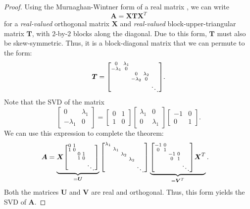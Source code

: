 \documentclass{sig-alternate}
\renewcommand{\cite}{\citep}
\newenvironment{sbmatrix}{\left[\!\begin{smallmatrix}}
{\end{smallmatrix}\!\right]}
\newcommand{\mat}{\boldsymbol}
\providecommand{\mA}{\ensuremath{\mat{A}}}
\providecommand{\mT}{\ensuremath{\mat{T}}}
\providecommand{\mU}{\ensuremath{\mat{U}}}
\providecommand{\mV}{\ensuremath{\mat{V}}}
\providecommand{\mX}{\ensuremath{\mat{X}}}
\begin{document}
\begin{proof}
Using the Murnaghan-Wintner form of a real matrix 
\cite{murnaghan1931-canonical-form}, we can
write 
\[ \mA = \mX \mT \mX^T \]
for a \emph{real-valued} orthogonal matrix $\mX$ and
\emph{real-valued} block-upper-triangular
matrix $\mT$, with $2$-by-$2$ blocks along the diagonal.
Due to this form, $\mT$ must also be skew-symmetric.  Thus,
it is a block-diagonal matrix that 
we can permute to the form: 
\[ \mT = \begin{sbmatrix}
           0 & \lambda_1 \\
           -\lambda_1 & 0 \\
           & & 0 & \lambda_2 \\
           & & -\lambda_2 & 0 \\
           & & & & \ddots \\
\end{sbmatrix}. \]
Note that the SVD of the matrix 
\[ \begin{bmatrix} 0 & \lambda_1 \\ -\lambda_1 & 0 \end{bmatrix} = 
\begin{bmatrix} 0 & 1 \\ 1 & 0 \end{bmatrix}
\begin{bmatrix} \lambda_1 & 0 \\ 0 & \lambda_1 \end{bmatrix}
\begin{bmatrix} -1 & 0 \\ 0 & 1 \end{bmatrix}.
\]
We can use this expression to complete the theorem:
\[
\begin{aligned}
\mA & = 
\underbrace{
	\mX 
	\begin{sbmatrix}
	   0 & 1 \\
	   1 & 0 \\
	   & & 0 & 1 \\
	   & & 1 & 0 \\
	   & & & & \ddots \\
\end{sbmatrix}
}_{= \mU} 
\begin{sbmatrix} 
  	\lambda_1 \\ 
	& \lambda_1 \\
	& & \lambda_2 \\
	& & & \lambda_2 \\
	& & & & \ddots \\
\end{sbmatrix} 
\underbrace{
	\begin{sbmatrix}
	   -1 & 0 \\
	   0 & 1 \\
	   & & -1 & 0 \\
	   & & 0 & 1 \\
	   & & & & \ddots \\
\end{sbmatrix}
	\mX^T
}_{= \mV^T}
. 
\end{aligned} \]
Both the matrices $\mU$ and $\mV$ are real and orthogonal.
Thus, this form yields the SVD of $\mA$.  
\end{proof}
\end{document}
